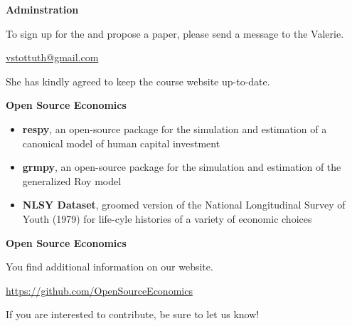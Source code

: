 \begin{frame}
	\textbf{Adminstration}\vspace{0.3cm}

To sign up for the and propose a paper, please send a message to the Valerie.

\begin{center}
\href{mailto:vstottuth@gmail.com}{vstottuth@gmail.com}
\end{center}

She has kindly agreed to keep the course website up-to-date.

\end{frame}
\begin{frame}\textbf{Open Source Economics}\vspace{0.3cm}

\begin{itemize}\setlength\itemsep{1em}
\item \textbf{respy}, an open-source package for the simulation and estimation of a canonical model of human capital investment
\item \textbf{grmpy}, an open-source package for the simulation and estimation of the generalized Roy model
\item \textbf{NLSY Dataset}, groomed version of the National Longitudinal Survey of Youth (1979) for life-cyle histories of a variety of economic choices
\end{itemize}

\end{frame}
\begin{frame}
	\textbf{Open Source Economics}\vspace{0.3cm}

You find additional information on our website.

\begin{center}
\url{https://github.com/OpenSourceEconomics}
\end{center}

If you are interested to contribute, be sure to let us know!

\end{frame}
